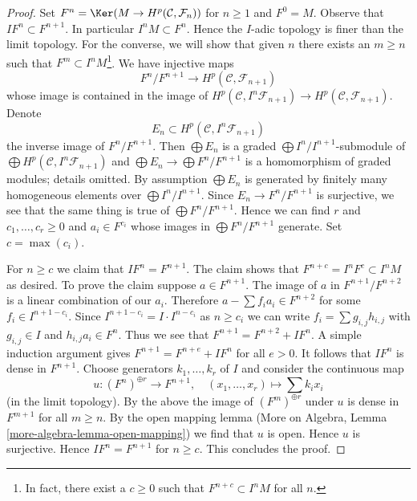 \begin{proof}
Set $F^n = \Ker(M \to H^p(\mathcal{C}, \mathcal{F}_n))$ for $n \geq 1$ and
$F^0 = M$.
Observe that $I F^n \subset F^{n + 1}$. In particular $I^n M \subset F^n$.
Hence the $I$-adic topology is finer than the limit topology. For
the converse, we will show that given $n$
there exists an $m \geq n$ such that $F^m \subset I^nM$\footnote{In fact,
there exist a $c \geq 0$ such that $F^{n + c} \subset I^nM$ for all $n$.}.
We have injective maps
$$
F^n/F^{n + 1} \longrightarrow H^p(\mathcal{C}, \mathcal{F}_{n + 1})
$$
whose image is contained in the image of
$H^p(\mathcal{C}, I^n\mathcal{F}_{n + 1}) \to
H^p(\mathcal{C}, \mathcal{F}_{n + 1})$.
Denote
$$
E_n \subset H^p(\mathcal{C}, I^n\mathcal{F}_{n + 1})
$$
the inverse image of $F^n/F^{n + 1}$. Then $\bigoplus E_n$ is
a graded $\bigoplus I^n/I^{n + 1}$-submodule of
$\bigoplus H^p(\mathcal{C}, I^n\mathcal{F}_{n + 1})$ and
$\bigoplus E_n \to \bigoplus F^n/F^{n + 1}$ is a homomorphism of graded
modules; details omitted. By assumption $\bigoplus E_n$ is generated by
finitely many homogeneous elements over $\bigoplus I^n/I^{n + 1}$.
Since $E_n \to F^n/F^{n + 1}$ is surjective, we see that
the same thing is true of $\bigoplus F^n/F^{n + 1}$.
Hence we can find $r$ and $c_1, \ldots, c_r \geq 0$ and
$a_i \in F^{c_i}$ whose images in $\bigoplus F^n/F^{n + 1}$ generate.
Set $c = \max(c_i)$.

\medskip\noindent
For $n \geq c$ we claim that $I F^n = F^{n + 1}$. The claim shows that
$F^{n + c} = I^nF^c \subset I^nM$ as desired. To prove the claim
suppose $a \in F^{n + 1}$. The image of
$a$ in $F^{n + 1}/F^{n + 2}$ is a linear combination
of our $a_i$. Therefore $a  - \sum f_i a_i \in F^{n + 2}$
for some $f_i \in I^{n + 1 - c_i}$. Since
$I^{n + 1 - c_i} = I \cdot I^{n - c_i}$ as $n \geq c_i$ we can write
$f_i = \sum g_{i, j} h_{i, j}$ with $g_{i, j} \in I$
and $h_{i, j}a_i \in F^n$. Thus we see that
$F^{n + 1} = F^{n + 2} + IF^n$.
A simple induction argument gives $F^{n + 1} = F^{n + e} + IF^n$
for all $e > 0$. It follows that $IF^n$ is dense in $F^{n + 1}$.
Choose generators $k_1, \ldots, k_r$ of $I$ and consider
the continuous map
$$
u : (F^n)^{\oplus r} \longrightarrow F^{n + 1},\quad
(x_1, \ldots, x_r) \mapsto \sum k_i x_i
$$
(in the limit topology).
By the above the image of $(F^m)^{\oplus r}$ under $u$ is dense in
$F^{m + 1}$ for all $m \geq n$. By the open mapping lemma
(More on Algebra, Lemma \ref{more-algebra-lemma-open-mapping}) we find
that $u$ is open. Hence $u$ is surjective. Hence $IF^n = F^{n + 1}$
for $n \geq c$. This concludes the proof.
\end{proof}

